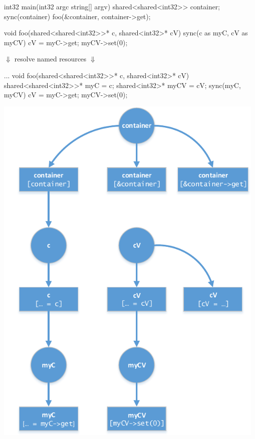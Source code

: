 \begin{minipage}{1\textwidth}
\begin{center}
\begin{minipage}{0.4\textwidth}
\begin{ccode}{}
int32 main(int32 argc string[] argv) {
  shared<shared<int32>> container;
  sync(container) { 
    foo(&container, container->get); 
  }
}

void foo(shared<shared<int32>>* c, 
         shared<int32>* cV) {
  sync(c as myC, cV as myCV) {
    cV = myC->get;
    myCV->set(0);
  }
}
\end{ccode}
\centering $\Downarrow$ resolve named resources $\Downarrow$ 
\begin{ccode}{}
...
void foo(shared<shared<int32>>* c, 
         shared<int32>* cV) {
  shared<shared<int32>>* myC = c;
  shared<int32>* myCV = cV;
  sync(myC, myCV) {
    cV = myC->get;
    myCV->set(0);
  }
}
\end{ccode}
\end{minipage}
\begin{minipage}{0.58\textwidth}
\includegraphics[scale=0.98]{pics/DataFlowDiagram}
\end{minipage}
\end{center}
\label{fig:dataFlowGraph}
\end{minipage}

